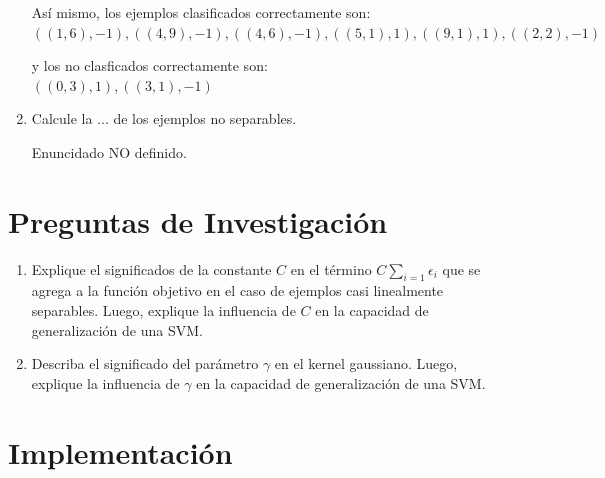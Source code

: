 \documentclass[paper=a4, fontsize=11pt]{scrartcl}
\numberwithin{equation}{section}		%
\numberwithin{figure}{section}			%
\numberwithin{table}{section}				%
\begin{document}
\begin{enumerate}
    Así mismo, los ejemplos clasificados correctamente son:\\
    ${((1,6),-1), ((4,9),-1), ((4,6),-1), ((5,1),1), ((9,1),1)}, ((2,2),-1)$
    
    y los no clasficados correctamente son:\\
    ${((0,3),1), ((3,1),-1)}$\\
    
    \item Calcule la ... de los ejemplos no separables.
    
    Enuncidado NO definido.

\end{enumerate}
\newpage
\section{Preguntas de Investigación}

\begin{enumerate}
    \item Explique el significados de la constante $C$ en el término $C\sum_{i=1}\epsilon_i$ que se agrega a la función objetivo en el caso de ejemplos casi linealmente separables. Luego, explique la influencia de $C$ en la capacidad de generalización de una SVM.
    
    \item Describa el significado del parámetro $\gamma$ en el kernel gaussiano. Luego, explique la influencia de $\gamma$ en la capacidad de generalización de una SVM.
    
\end{enumerate}

\newpage
\section{Implementación}
\end{document}
